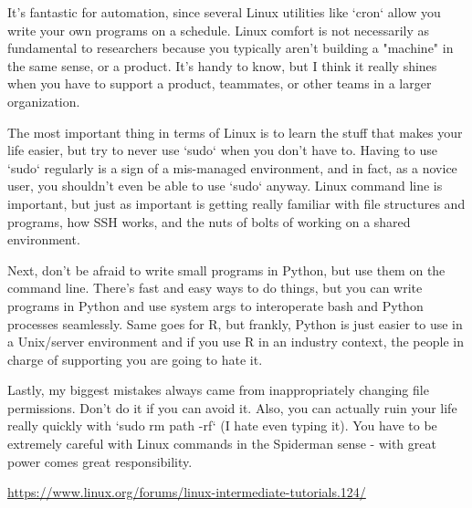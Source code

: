 \documentclass[12pt]{article}
\begin{document}
\begin{enumerate}
It's fantastic for automation, since several Linux utilities like `cron` allow you write your own programs on a schedule. Linux comfort is not necessarily as fundamental to researchers because you typically aren't building a "machine" in the same sense, or a product. It's handy to know, but I think it really shines when you have to support a product, teammates, or other teams in a larger organization.

The most important thing in terms of Linux is to learn the stuff that makes your life easier, but try to never use `sudo` when you don't have to. Having to use `sudo` regularly is a sign of a mis-managed environment, and in fact, as a novice user, you shouldn't even be able to use `sudo` anyway. Linux command line is important, but just as important is getting really familiar with file structures and programs, how SSH works, and the nuts of bolts of working on a shared environment.

Next, don't be afraid to write small programs in Python, but use them on the command line. There's fast and easy ways to do things, but you can write programs in Python and use system args to interoperate bash and Python processes seamlessly. Same goes for R, but frankly, Python is just easier to use in a Unix/server environment and if you use R in an industry context, the people in charge of supporting you are going to hate it.

Lastly, my biggest mistakes always came from inappropriately changing file permissions. Don't do it if you can avoid it. Also, you can actually ruin your life really quickly with `sudo rm {path} -rf` (I hate even typing it). You have to be extremely careful with Linux commands in the Spiderman sense - with great power comes great responsibility. 


\url{https://www.linux.org/forums/linux-intermediate-tutorials.124/}

\end{enumerate}
\end{document}
